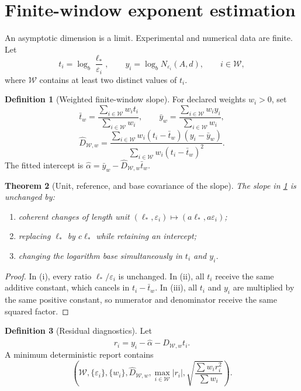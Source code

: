 \documentclass[11pt,a4paper]{article}
\theoremstyle{definition}
\newtheorem{definition}{Definition}[section]
\theoremstyle{plain}
\newtheorem{theorem}[definition]{Theorem}
\theoremstyle{remark}
\newcommand{\Wcal}{\mathcal{W}}
\newcommand{\abs}[1]{\left\lvert #1\right\rvert}
\begin{document}
\section{Finite-window exponent estimation}

An asymptotic dimension is a limit. Experimental and numerical data are
finite. Let
\[
t_i=\log_b\frac{\ell_*}{\varepsilon_i},
\qquad
y_i=\log_bN_{\varepsilon_i}(A,d),
\qquad i\in\Wcal,
\]
where $\Wcal$ contains at least two distinct values of $t_i$.

\begin{definition}[Weighted finite-window slope]
\label{def:wls}
For declared weights $w_i>0$, set
\[
\bar t_w=\frac{\sum_{i\in\Wcal}w_it_i}
                {\sum_{i\in\Wcal}w_i},
\qquad
\bar y_w=\frac{\sum_{i\in\Wcal}w_iy_i}
                {\sum_{i\in\Wcal}w_i},
\]
\[
\widehat D_{\Wcal,w}
=
\frac{\sum_{i\in\Wcal}w_i(t_i-\bar t_w)(y_i-\bar y_w)}
     {\sum_{i\in\Wcal}w_i(t_i-\bar t_w)^2}.
\]
The fitted intercept is
$\widehat\alpha=\bar y_w-\widehat D_{\Wcal,w}\bar t_w$.
\end{definition}

\begin{theorem}[Unit, reference, and base covariance of the slope]
\label{thm:slope-covariance}
The slope in \cref{def:wls} is unchanged by:
\begin{enumerate}[label=(\roman*)]
\item coherent changes of length unit
      $(\ell_*,\varepsilon_i)\mapsto(a\ell_*,a\varepsilon_i)$;
\item replacing $\ell_*$ by $c\ell_*$ while retaining an intercept;
\item changing the logarithm base simultaneously in $t_i$ and $y_i$.
\end{enumerate}
\end{theorem}

\begin{proof}
In (i), every ratio $\ell_*/\varepsilon_i$ is unchanged. In (ii), all
$t_i$ receive the same additive constant, which cancels in
$t_i-\bar t_w$. In (iii), all $t_i$ and $y_i$ are multiplied by the same
positive constant, so numerator and denominator receive the same squared
factor.
\end{proof}

\begin{definition}[Residual diagnostics]
Let
\[
r_i=y_i-\widehat\alpha-\widehat D_{\Wcal,w}t_i.
\]
A minimum deterministic report contains
\[
\left(
\Wcal,\{\varepsilon_i\},\{w_i\},
\widehat D_{\Wcal,w},
\max_{i\in\Wcal}\abs{r_i},
\sqrt{\frac{\sum w_ir_i^2}{\sum w_i}}
\right).
\]
\end{definition}
\end{document}
